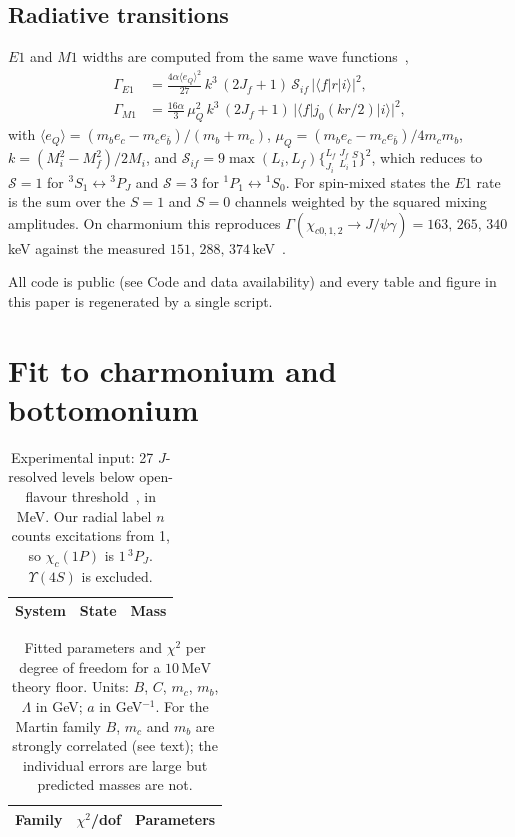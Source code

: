 \documentclass[10pt,twocolumn]{article}
\newcommand{\MeV}{\,\mathrm{MeV}}
\begin{document}
\subsection{Radiative transitions}

$E1$ and $M1$ widths are computed from the same wave functions~\cite{Eichten1994},
\begin{align}
  \Gamma_{E1} &= \frac{4\alpha\langle e_Q\rangle^2}{27}\,k^3\,(2J_f+1)\,\mathcal S_{if}\,|\langle f|r|i\rangle|^2,\\
  \Gamma_{M1} &= \frac{16\alpha}{3}\,\mu_Q^2\,k^3\,(2J_f+1)\,|\langle f|j_0(kr/2)|i\rangle|^2,
\end{align}
with $\langle e_Q\rangle=(m_be_c-m_ce_{\bar b})/(m_b+m_c)$, $\mu_Q=(m_be_c-m_ce_{\bar b})/4m_cm_b$, $k=(M_i^2-M_f^2)/2M_i$, and $\mathcal S_{if}=9\max(L_i,L_f)\{^{L_f}_{J_i}\,^{J_f}_{L_i}\,^{S}_{1}\}^2$, which reduces to $\mathcal S=1$ for $^3S_1\leftrightarrow{}^3P_J$ and $\mathcal S=3$ for $^1P_1\leftrightarrow{}^1S_0$.
For spin-mixed states the $E1$ rate is the sum over the $S=1$ and $S=0$ channels weighted by the squared mixing amplitudes.
On charmonium this reproduces $\Gamma(\chi_{c0,1,2}\to J/\psi\gamma)=163,\,265,\,340\,$keV against the measured $151,\,288,\,374\,$keV~\cite{PDG2026}.

All code is public (see Code and data availability) and every table and figure in this paper is regenerated by a single script.

\section{Fit to charmonium and bottomonium}
\label{sec:fit}

\begin{table}[t]
\caption{Experimental input: 27 $J$-resolved levels below open-flavour threshold~\cite{PDG2026}, in MeV. Our radial label $n$ counts excitations from 1, so $\chi_c(1P)$ is $1\,^3P_J$. $\Upsilon(4S)$ is excluded.}
\label{tab:data}
\centering\small
\begin{tabular}{llr}
\toprule
System & State & Mass \\
\midrule

\end{tabular}
\end{table}

\begin{table}[t]
\caption{Fitted parameters and $\chi^2$ per degree of freedom for a $10\MeV$ theory floor. Units: $B$, $C$, $m_c$, $m_b$, $\Lambda$ in GeV; $a$ in GeV$^{-1}$. For the Martin family $B$, $m_c$ and $m_b$ are strongly correlated (see text); the individual errors are large but predicted masses are not.}
\label{tab:params}
\centering\small
\begin{tabular}{llp{11.5cm}}
\toprule
Family & $\chi^2$/dof & Parameters \\
\midrule

\end{tabular}
\end{table}
\end{document}
